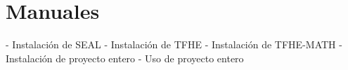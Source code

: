 \chapter{Manuales}
\label{appendix:manuales}

- Instalación de SEAL
- Instalación de TFHE
- Instalación de TFHE-MATH
- Instalación de proyecto entero
- Uso de proyecto entero
